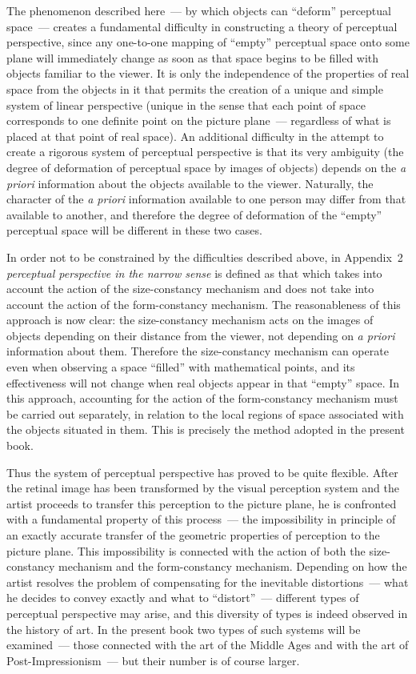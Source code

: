 The phenomenon described here~--- by which objects can ``deform'' perceptual space~---
creates a fundamental difficulty in constructing a theory of perceptual perspective,
since any one-to-one mapping of ``empty'' perceptual space onto some plane will
immediately change as soon as that space begins to be filled with objects familiar to the
viewer.  It is only the independence of the properties of real space from the objects in
it that permits the creation of a unique and simple system of linear perspective
(unique in the sense that each point of space corresponds to one definite point on the
picture plane~--- regardless of what is placed at that point of real space).  An additional
difficulty in the attempt to create a rigorous system of perceptual perspective is that its
very ambiguity (the degree of deformation of perceptual space by images of objects)
depends on the \emph{a priori} information about the objects available to the viewer.
Naturally, the character of the \emph{a priori} information available to one person may
differ from that available to another, and therefore the degree of deformation of the
``empty'' perceptual space will be different in these two cases.

In order not to be constrained by the difficulties described above, in Appendix~2
\emph{perceptual perspective in the narrow sense} is defined as that which takes into
account the action of the size-constancy mechanism and does not take into account the
action of the form-constancy mechanism.  The reasonableness of this approach is now
clear: the size-constancy mechanism acts on the images of objects depending on their
distance from the viewer, not depending on \emph{a priori} information about them.
Therefore the size-constancy mechanism can operate even when observing a space
``filled'' with mathematical points, and its effectiveness will not change when real
objects appear in that ``empty'' space.  In this approach, accounting for the action of the
form-constancy mechanism must be carried out separately, in relation to the local
regions of space associated with the objects situated in them.  This is precisely the
method adopted in the present book.


Thus the system of perceptual perspective has proved to be quite flexible.  After the
retinal image has been transformed by the visual perception system and the artist
proceeds to transfer this perception to the picture plane, he is confronted with a
fundamental property of this process~--- the impossibility in principle of an exactly
accurate transfer of the geometric properties of perception to the picture plane.  This
impossibility is connected with the action of both the size-constancy mechanism and the
form-constancy mechanism.  Depending on how the artist resolves the problem of
compensating for the inevitable distortions~--- what he decides to convey exactly and
what to ``distort''~--- different types of perceptual perspective may arise, and this
diversity of types is indeed observed in the history of art.  In the present book two
types of such systems will be examined~--- those connected with the art of the Middle
Ages and with the art of Post-Impressionism~--- but their number is of course larger.

